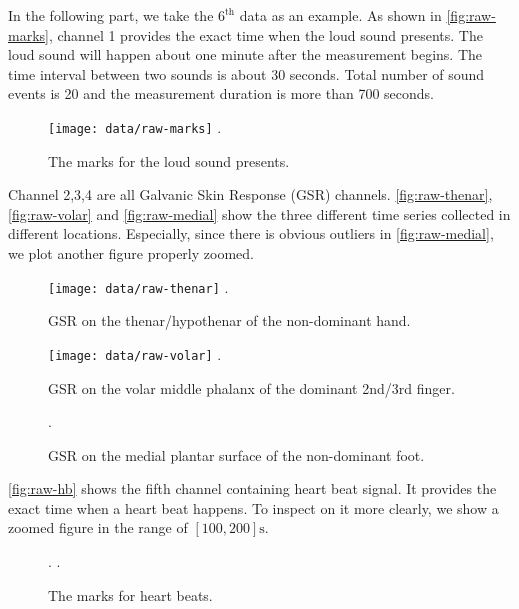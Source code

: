 \documentclass[]{article}
\begin{document}
In the following part, we take the $6^{\mathrm{th}}$ data as an example. As shown in \autoref{fig:raw-marks}, channel 1 provides the exact time when the loud sound presents. The loud sound will happen about one minute after the measurement begins. The time interval between two sounds is about 30 seconds. Total number of sound events is 20 and the measurement duration is more than 700 seconds. 

\begin{figure}[htbp]
  \centering
  \texttt{[image: data/raw-marks]}
  \DeclareGraphicsExtensions.
  \caption{The marks for the loud sound presents.} \label{fig:raw-marks}
\end{figure}

Channel 2,3,4 are all Galvanic Skin Response (GSR) channels. \autoref{fig:raw-thenar}, \autoref{fig:raw-volar} and \autoref{fig:raw-medial} show the three different time series collected in different locations. Especially, since there is obvious outliers in \autoref{fig:raw-medial}, we plot another figure properly zoomed.

\begin{figure}[htbp]
  \centering
  \texttt{[image: data/raw-thenar]}
  \DeclareGraphicsExtensions.
  \caption{GSR on the thenar/hypothenar of the non-dominant hand.} \label{fig:raw-thenar}
\end{figure}

\begin{figure}[htbp]
  \centering
  \texttt{[image: data/raw-volar]}
  \DeclareGraphicsExtensions.
  \caption{GSR on the volar middle phalanx of the dominant 2nd/3rd finger.} \label{fig:raw-volar}
\end{figure}

\begin{figure}[htbp]
  \centering
  \DeclareGraphicsExtensions.
  \caption{GSR on the medial plantar surface of the non-dominant foot.} \label{fig:raw-medial}
\end{figure}

\autoref{fig:raw-hb} shows the fifth channel containing heart beat signal. It provides the exact time when a heart beat happens. To inspect on it more clearly, we show a zoomed figure in the range of $[100,200]\mathrm{s}$.

\begin{figure}[htbp]
  \centering
  \DeclareGraphicsExtensions.
  \DeclareGraphicsExtensions.
  \caption{The marks for heart beats.} \label{fig:raw-hb}
\end{figure}
\end{document}
